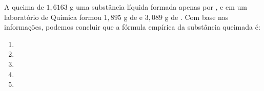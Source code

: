 A queima de $1,6163$ g uma substância líquida formada apenas por ,  e  em um laboratório de Química formou $1,895$ g de  e $3,089$ g de .
Com base nas informações, podemos concluir que a fórmula empírica da substância queimada é:

\begin{enumerate}[label = (\alph*), itemjoin={\qquad}]
	\item {}
	\item {}
	\item {}
	\item {}
	\item {}
\end{enumerate}

